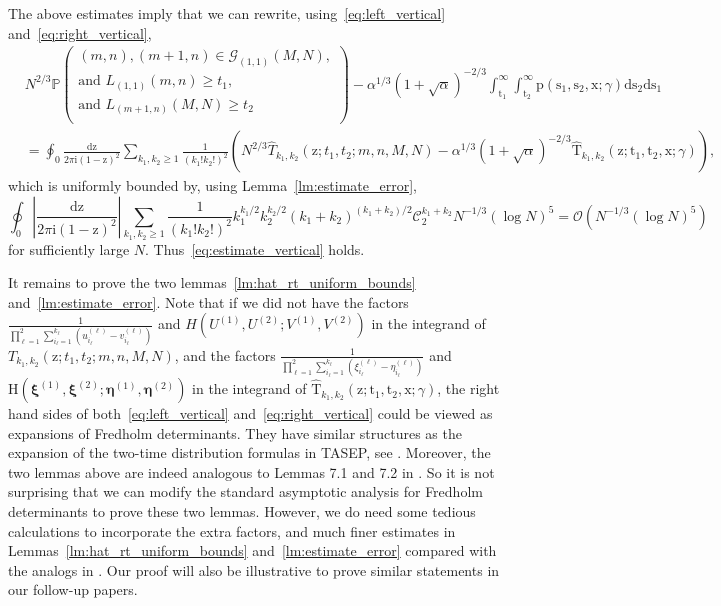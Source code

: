 \documentclass{article}
\numberwithin{equation}{section}
\newcommand{\bigO}{\mathcal{O}}
\newcommand{\CC}{\mathcal{C}}
\newcommand{\ddbar}[2]{\frac{{\mathrm d}#1}{2\pi {\mathrm i}#2}}
\newcommand{\gd}{{\mathcal{G}}}
\newcommand{\limp}{\mathrm{p}}
\newcommand{\prob}{\mathbb{P}}
\begin{document}
 
The above estimates imply that we can rewrite, using~\eqref{eq:left_vertical} and~\eqref{eq:right_vertical},
\begin{equation*}
	\begin{split}
		&N^{2/3}\prob
		\left(
		\begin{array}{l}
			(m,n), (m+1,n)\in \gd_{(1,1)}{(M,N)},\\
			\mbox{and }L_{(1,1)}(m,n)\ge t_1, \\
			\mbox{and } L_{(m+1,n)}(M,N)\ge t_2\\
		\end{array}
		\right)
		-\alpha^{1/3}(1+\sqrt{\alpha})^{-2/3}\int_{\mathrm{t}_1}^\infty \int_{\mathrm{t}_2}^\infty\limp(\mathrm{s}_1,\mathrm{s}_2,\mathrm{x};\gamma)\mathrm{d}{\mathrm{s}_2}\mathrm{d}{\mathrm{s}_1}\\
		&=\oint_0\ddbar{\mathrm{z}}{\mathrm{(1-z)^2}}\sum_{k_1,k_2\ge 1}
		\frac{1}{(k_1!k_2!)^2}\left(N^{2/3}\hat T_{k_1,k_2}(\mathrm{z};t_1,t_2;m,n,M,N)-\alpha^{1/3}(1+\sqrt{\alpha})^{-2/3}\mathrm{\hat T}_{k_1,k_2}(\mathrm{z};\mathrm{t}_1,\mathrm{t}_2,\mathrm{x};\gamma)\right),
	\end{split}
\end{equation*}
which is uniformly bounded by, using Lemma~\ref{lm:estimate_error},
\begin{equation*}
	\oint_0\left|\ddbar{\mathrm{z}}{\mathrm{(1-z)^2}}\right|\sum_{k_1,k_2\ge 1}
	\frac{1}{(k_1!k_2!)^2} k_1^{k_1/2}k_2^{k_2/2}(k_1+k_2)^{(k_1+k_2)/2}\CC_2^{k_1+k_2} N^{-1/3}(\log N)^5=\bigO(N^{-1/3}(\log N)^5)
\end{equation*}
for sufficiently large $N$. Thus~\eqref{eq:estimate_vertical} holds. 

\bigskip

It remains to prove the two lemmas~\ref{lm:hat_rt_uniform_bounds} and~\ref{lm:estimate_error}. Note that if we did not have the factors $\frac{1}{\prod_{\ell=1}^2\sum_{i_\ell=1}^{k_\ell}(u_{i_\ell}^{(\ell)} -v_{i_\ell}^{(\ell)})}$ and
$H(U^{(1)},U^{(2)};V^{(1)},V^{(2)})$ in the integrand of $T_{k_1,k_2}(\mathrm{z};t_1,t_2;m,n,M,N)$, and the factors $\frac{1}{\prod_{\ell=1}^2\sum_{i_\ell=1}^{k_\ell}(\xi_{i_\ell}^{(\ell)} -\eta_{i_\ell}^{(\ell)})}$ and
 $\mathrm{H}(\boldsymbol{\xi}^{(1)},\boldsymbol{\xi}^{(2)};
\boldsymbol{\eta}^{(1)},\boldsymbol{\eta}^{(2)})$ in the integrand of $\mathrm{\hat T}_{k_1,k_2}(\mathrm{z};\mathrm{t}_1,\mathrm{t}_2,\mathrm{x};\gamma)$, the right hand sides of both~\eqref{eq:left_vertical} and~\eqref{eq:right_vertical} could be viewed as expansions of Fredholm determinants. They have similar structures as the expansion of the two-time distribution formulas in TASEP, see \cite[Proposition 2.10]{Liu19}. Moreover, the two lemmas above are indeed analogous to Lemmas 7.1 and 7.2 in \cite{Liu19}. So it is not surprising that we can modify the standard asymptotic analysis for Fredholm determinants to prove these two lemmas. However, we do need some tedious calculations to incorporate the extra factors, and much finer estimates in Lemmas~\ref{lm:hat_rt_uniform_bounds} and~\ref{lm:estimate_error} compared with the analogs in \cite{Liu19}. Our proof will also be illustrative to prove similar statements in our follow-up papers.
\end{document}
